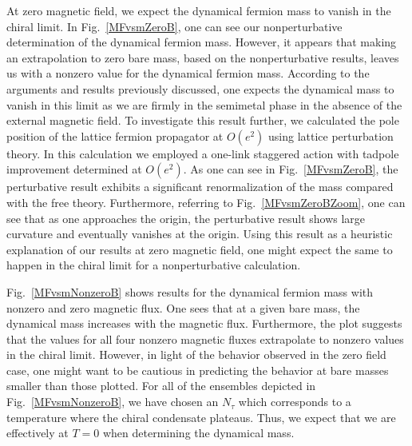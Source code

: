 \documentclass[aps,prd,twocolumn,showpacs,superscriptaddress,groupedaddress]{revtex4}  %
\begin{document}
At zero magnetic field, we expect the dynamical fermion mass to vanish in the chiral limit. In Fig.~\ref{MFvsmZeroB}, one can see our nonperturbative determination of the dynamical fermion mass. However, it appears that making an extrapolation to zero bare mass, based on the nonperturbative results, leaves us with a nonzero value for the dynamical fermion mass. According to the arguments and results previously discussed, one expects the dynamical mass to vanish in this limit as we are firmly in the semimetal phase in the absence of the external magnetic field. To investigate this result further, we calculated the pole position of the lattice fermion propagator at $O(e^2)$ using lattice perturbation theory. In this calculation we employed a one-link staggered action with tadpole improvement determined at $O(e^2)$. As one can see in Fig.~\ref{MFvsmZeroB}, the perturbative result exhibits a significant renormalization of the mass compared with the free theory. Furthermore, referring to Fig.~\ref{MFvsmZeroBZoom}, one can see that as one approaches the origin, the perturbative result shows large curvature and eventually vanishes at the origin. Using this result as a heuristic explanation of our results at zero magnetic field, one might expect the same to happen in the chiral limit for a nonperturbative calculation.

Fig.~\ref{MFvsmNonzeroB} shows results for the dynamical fermion mass with nonzero and zero magnetic flux. One sees that at a given bare mass, the dynamical mass increases with the magnetic flux. Furthermore, the plot suggests that the values for all four nonzero magnetic fluxes extrapolate to nonzero values in the chiral limit. However, in light of the behavior observed in the zero field case, one might want to be cautious in predicting the behavior at bare masses smaller than those plotted. For all of the ensembles depicted in Fig.~\ref{MFvsmNonzeroB}, we have chosen an $N_{\tau}$ which corresponds to a temperature where the chiral condensate plateaus. Thus, we expect that we are effectively at $T=0$ when determining the dynamical mass.
\end{document}
